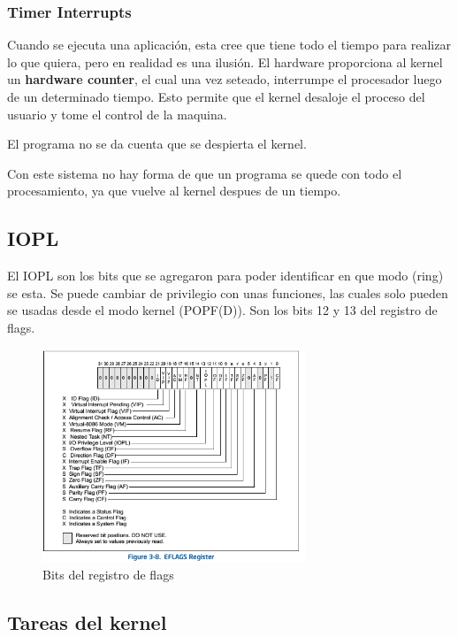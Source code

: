 \documentclass[titlepage,a4paper]{article}
\begin{document}
\subsubsection*{Timer Interrupts}

Cuando se ejecuta una aplicación, esta cree que tiene todo el tiempo para realizar lo que quiera, pero en realidad es una ilusión. El hardware proporciona al kernel un \textbf{hardware counter}, el cual una vez seteado, interrumpe el procesador luego de un determinado tiempo. Esto permite que el kernel desaloje el proceso del usuario y tome el control de la maquina. 

El programa no se da cuenta que se despierta el kernel.

Con este sistema no hay forma de que un programa se quede con todo el procesamiento, ya que vuelve al kernel despues de un tiempo. 

\subsection*{IOPL}
El IOPL son los bits que se agregaron para poder identificar en que modo (ring) se esta. Se puede cambiar de privilegio con unas funciones, las cuales solo pueden se usadas desde el modo kernel (POPF(D)). Son los bits 12 y 13 del registro de flags.

\begin{figure}[!htb]
    \centering
    \includegraphics[width=0.7\textwidth]{ImagenesApunte/FlagsRegister.png}
    \caption{Bits del registro de flags}
\end{figure}

\subsection*{Tareas del kernel}
\end{document}
